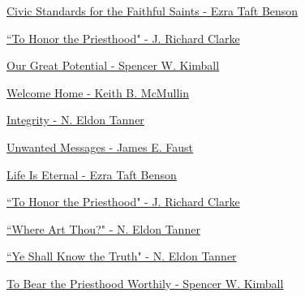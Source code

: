 \href{https://www.lds.org/general-conference/1972/04/civic-standards-for-the-faithful-saints?lang=eng}{Civic Standards for the Faithful Saints - Ezra Taft Benson}

\href{https://www.lds.org/general-conference/1991/04/to-honor-the-priesthood?lang=eng}{``To Honor the Priesthood" - J. Richard Clarke}

\href{https://www.lds.org/general-conference/1977/04/our-great-potential?lang=eng}{Our Great Potential - Spencer W. Kimball}

\href{https://www.lds.org/general-conference/1999/04/welcome-home?lang=eng}{Welcome Home - Keith B. McMullin}

\href{https://www.lds.org/general-conference/1977/04/integrity?lang=eng}{Integrity - N. Eldon Tanner}

\href{https://www.lds.org/general-conference/1986/10/unwanted-messages?lang=eng}{Unwanted Messages - James E. Faust}

\href{https://www.lds.org/general-conference/1971/04/life-is-eternal?lang=eng}{Life Is Eternal - Ezra Taft Benson}

\href{https://www.lds.org/general-conference/1991/04/to-honor-the-priesthood?lang=eng}{``To Honor the Priesthood" - J. Richard Clarke}

\href{https://www.lds.org/general-conference/1971/10/where-art-thou?lang=eng}{``Where Art Thou?" - N. Eldon Tanner}

\href{https://www.lds.org/general-conference/1978/04/ye-shall-know-the-truth?lang=eng}{``Ye Shall Know the Truth" - N. Eldon Tanner}

\href{https://www.lds.org/general-conference/1975/04/to-bear-the-priesthood-worthily?lang=eng}{To Bear the Priesthood Worthily - Spencer W. Kimball}



